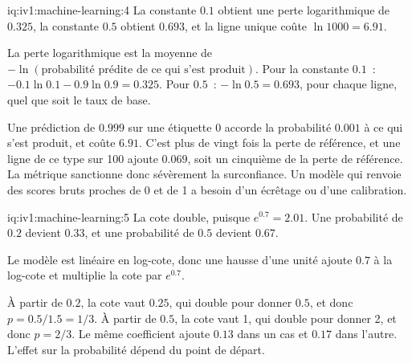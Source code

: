 \begin{solution}{iq:iv1:machine-learning:4}
La constante $0.1$ obtient une perte logarithmique de $0.325$, la constante $0.5$ obtient $0.693$, et la ligne unique coûte $\ln 1000 = 6.91$.

La perte logarithmique est la moyenne de $-\ln(\text{probabilité prédite de ce qui s'est produit})$. Pour la constante $0.1$~: $-0.1\ln 0.1 - 0.9\ln 0.9 = 0.325$. Pour $0.5$~: $-\ln 0.5 = 0.693$, pour chaque ligne, quel que soit le taux de base.

Une prédiction de $0.999$ sur une étiquette 0 accorde la probabilité $0.001$ à ce qui s'est produit, et coûte $6.91$. C'est plus de vingt fois la perte de référence, et une ligne de ce type sur 100 ajoute $0.069$, soit un cinquième de la perte de référence. La métrique sanctionne donc sévèrement la surconfiance. Un modèle qui renvoie des scores bruts proches de 0 et de 1 a besoin d'un écrêtage ou d'une calibration.



\end{solution}

\begin{solution}{iq:iv1:machine-learning:5}
La cote double, puisque $e^{0.7} = 2.01$. Une probabilité de $0.2$ devient $0.33$, et une probabilité de $0.5$ devient $0.67$.

Le modèle est linéaire en log-cote, donc une hausse d'une unité ajoute $0.7$ à la log-cote et multiplie la cote par $e^{0.7}$.

À partir de $0.2$, la cote vaut $0.25$, qui double pour donner $0.5$, et donc $p = 0.5/1.5 = 1/3$. À partir de $0.5$, la cote vaut 1, qui double pour donner 2, et donc $p = 2/3$. Le même coefficient ajoute $0.13$ dans un cas et $0.17$ dans l'autre. L'effet sur la probabilité dépend du point de départ.



\end{solution}

